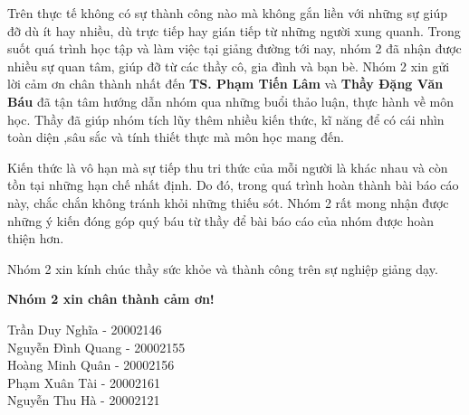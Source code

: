 \documentclass[
12pt,
oneside,
english,
doublespacing,
nolistspacing,
liststotoc,
parskip,
headsepline,
chapterinoneline,
]{HUSdissertation}
\author{Nhóm 2}
\begin{document}
\lstset{style=codeC}	%

\frontmatter 			%

\pagestyle{plain} 


%






\begin{acknowledgements}
	\addchaptertocentry{\acknowledgementname}
	\thispagestyle{empty}
	
	Trên thực tế không có sự thành công nào mà không gắn liền với những sự giúp đỡ dù ít hay nhiều, dù trực tiếp hay gián tiếp từ những người xung quanh. Trong suốt quá trình học tập và làm việc tại giảng đường tới nay, nhóm 2 đã nhận được nhiều sự quan tâm, giúp đỡ từ các thầy cô, gia đình và bạn bè. Nhóm 2 xin gửi lời cảm ơn chân thành nhất đến \textbf{TS. Phạm Tiến Lâm} và \textbf{Thầy Đặng Văn Báu} đã tận tâm hướng dẫn nhóm qua những buổi thảo luận, thực hành về môn học. Thầy đã giúp nhóm tích lũy thêm nhiều kiến thức, kĩ năng để có cái nhìn toàn diện ,sâu sắc và tính thiết thực mà môn học mang đến.
	
	Kiến thức là vô hạn mà sự tiếp thu tri thức của mỗi người là khác nhau và còn tồn tại những hạn chế nhất định. Do đó, trong quá trình hoàn thành bài báo cáo này, chắc chắn không tránh khỏi những thiếu sót. Nhóm 2 rất mong nhận được những ý kiến đóng góp quý báu từ thầy để bài báo cáo của nhóm được hoàn thiện hơn.
	
	Nhóm 2 xin kính chúc thầy sức khỏe và thành công trên sự nghiệp giảng dạy.
	
	\textbf{Nhóm 2 xin chân thành cảm ơn!}
	
	\begin{flushright}
		
		Trần Duy Nghĩa - 20002146\\
		Nguyễn Đình Quang - 20002155\\
		Hoàng Minh Quân - 20002156\\
		Phạm Xuân Tài - 20002161\\
		Nguyễn Thu Hà - 20002121\\
		
	\end{flushright}
\end{acknowledgements}
\end{document}
